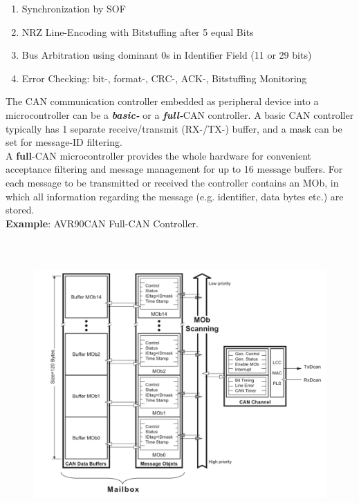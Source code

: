 \begin{enumerate}
\item  Synchronization by SOF
\item  NRZ Line-Encoding with Bitstuffing after 5 equal Bits
\item  Bus Arbitration using dominant 0s in Identifier Field (11 or 29 bits)
\item  Error Checking: bit-, format-, CRC-, ACK-, Bitstuffing Monitoring
\end{enumerate}

The CAN communication controller embedded as peripheral device into a microcontroller can be a \textbf{\textit{basic-}} or a \textbf{\textit{full-}}CAN controller. A basic CAN controller typically has 1 separate receive/transmit (RX-/TX-) buffer, and a mask can be set for message-ID filtering.\\

A \textbf{full}-CAN microcontroller provides the whole hardware for convenient acceptance filtering and message management for up to 16 message buffers. For each message to be transmitted or received the controller contains an MOb, in which all information regarding the message (e.g. identifier, data bytes etc.) are stored.\\

\textbf{Example}: AVR90CAN Full-CAN Controller. 

    \begin{figure}[h]
    \centering
    \includegraphics[width=15cm, height=11cm]{Images/image55.png}
    \label{fig:Fig 152}
    \end{figure}

